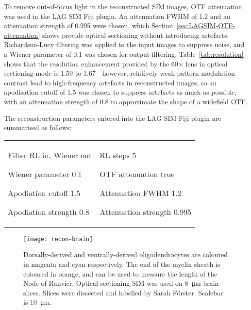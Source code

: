 To remove out-of-focus light in the reconstructed SIM images, OTF attenuation was used in the LAG SIM Fiji plugin.
An attenuation FWHM of 1.2 and an attenuation strength of 0.995 were chosen, which Section~\ref{sec:LAGSIM-OTF-attenuation} shows provide optical sectioning without introducing artefacts.
Richardson-Lucy filtering was applied to the input images to suppress noise, and a Wiener parameter of 0.1 was chosen for output filtering.
Table~\ref{tab:resolution} shows that the resolution enhancement provided by the 60$\times$ lens in optical sectioning mode is 1.59 to 1.67 - however, relatively weak pattern modulation contrast lead to high-frequency artefacts in reconstructed images, so an apodisation cutoff of 1.5 was chosen to suppress artefacts as much as possible, with an attenuation strength of 0.8 to approximate the shape of a widefield OTF.

The reconstruction parameters entered into the LAG SIM Fiji plugin are summarised as follows:\newline
\begin{tabular}{p{}p{}}
\begin{labelling}[margin={Attenuation strength}]
	\item[Filter] RL in, Wiener out
	\item[Wiener parameter] 0.1
	\item[Apodiation cutoff] 1.5
	\item[Apodiation strength] 0.8
\end{labelling} &
\begin{labelling}[margin={Attenuation strength}]
	\item[RL steps] 5
	\item[OTF attenuation] true
	\item[Attenuation FWHM] 1.2
	\item[Attenuation strength] 0.995
\end{labelling}
\end{tabular}

\begin{figure}[tbp!]
\centering
\texttt{[image: recon-brain]}
\caption[LAG SIM: Multicolour optical sectioning SIM to measure the Node of Ranvier on ventrally- and dorsally-derived oligodendrocytes]{Dorsally-derived and ventrally-derived oligodendrocytes are coloured in magenta and cyan respectively. The end of the myelin sheath is coloured in orange, and can be used to measure the length of the Node of Ranvier. Optical sectioning SIM was used on \SI{8}{\micro\metre} brain slices. Slices were dissected and labelled by Sarah F{\"o}rster. Scalebar is \SI{10}{\micro\metre}. }
\label{fig:recon-brain}
\end{figure}
\afterpage{\clearpage}

